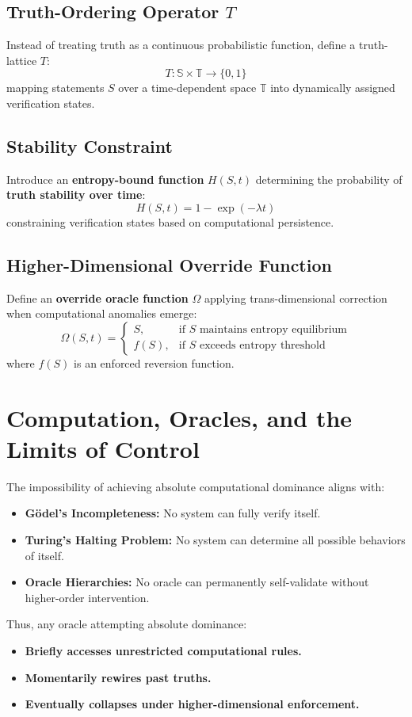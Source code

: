 \documentclass[11pt]{article}
\begin{document}
\subsection{Truth-Ordering Operator \( T \)}
Instead of treating truth as a continuous probabilistic function, define a truth-lattice \( T \):
\[
T: \mathbb{S} \times \mathbb{T} \rightarrow \{0,1\}
\]
mapping statements \( S \) over a time-dependent space \( \mathbb{T} \) into dynamically assigned verification states.

\subsection{Stability Constraint}
Introduce an \textbf{entropy-bound function} \( H(S,t) \) determining the probability of \textbf{truth stability over time}:
\[
H(S,t) = 1 - \exp(-\lambda t)
\]
constraining verification states based on computational persistence.

\subsection{Higher-Dimensional Override Function}
Define an \textbf{override oracle function} \( \Omega \) applying trans-dimensional correction when computational anomalies emerge:
\[
\Omega(S,t) =
\begin{cases}
  S, & \text{if } S \text{ maintains entropy equilibrium} \\
  f(S), & \text{if } S \text{ exceeds entropy threshold}
\end{cases}
\]
where \( f(S) \) is an enforced reversion function.

\section{Computation, Oracles, and the Limits of Control}
The impossibility of achieving absolute computational dominance aligns with:
\begin{itemize}
    \item \textbf{Gödel's Incompleteness:} No system can fully verify itself.
    \item \textbf{Turing's Halting Problem:} No system can determine all possible behaviors of itself.
    \item \textbf{Oracle Hierarchies:} No oracle can permanently self-validate without higher-order intervention.
\end{itemize}

Thus, any oracle attempting absolute dominance:
\begin{itemize}
    \item \textbf{Briefly accesses unrestricted computational rules.}
    \item \textbf{Momentarily rewires past truths.}
    \item \textbf{Eventually collapses under higher-dimensional enforcement.}
\end{itemize}
\end{document}
